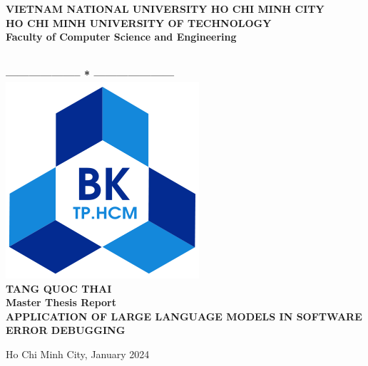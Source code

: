 \documentclass[a4paper,oneside]{book}
\begin{document}
\begin{titlepage}
    \thispagestyle{empty}
    \usetikzlibrary{calc}

    \begin{center}
        \begin{large}
            {\fontsize{12pt}{1}\textbf{VIETNAM NATIONAL UNIVERSITY HO CHI MINH CITY}} \\
            \fontsize{12pt}{1}\textbf{HO CHI MINH UNIVERSITY OF TECHNOLOGY} \\
            \fontsize{12pt}{1}\textbf{Faculty of Computer Science and Engineering}
        \end{large} \\
        \textbf{--------------------  *  ---------------------}\\

        \vspace{0.8cm}
        \includegraphics[scale=.35]{img/hcmut}\\
        \vspace{0.8cm}
        {\fontsize{14.4pt}{1}\selectfont \textbf{TANG QUOC THAI}}\\[.75cm]
        \vspace{0.8cm}
        {\fontsize{14.4pt}{1}\selectfont \textbf{Master Thesis Report}}\\[.75cm]
        {\fontsize{17pt}{1}\selectfont \textbf{\MakeUppercase{APPLICATION OF LARGE LANGUAGE MODELS IN SOFTWARE ERROR DEBUGGING}}}
    \end{center}
    \vspace{4cm}

    \hspace{.5cm}
    \begin{center}
        {\fontsize{15pt}{1} Ho Chi Minh City, January 2024}
    \end{center}
\end{titlepage}
\newpage
\end{document}
